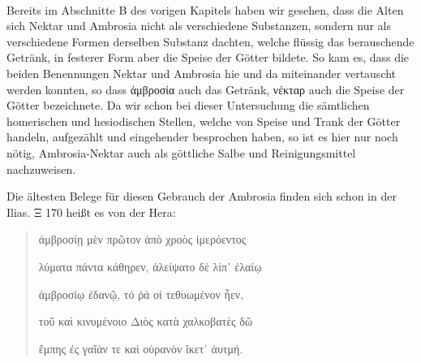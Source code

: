 \documentclass[a4paper, 11pt, oneside]{article}
\begin{document}
\paragraph{}
Bereits im Abschnitte B des vorigen Kapitels haben wir gesehen, dass die Alten sich Nektar und Ambrosia nicht als verschiedene Substanzen, sondern nur als verschiedene Formen derselben Substanz dachten, welche flüssig das berauschende Getränk, in festerer Form aber die Speise der Götter bildete. So kam es, dass die beiden Benennungen Nektar und Ambrosia hie und da miteinander vertauscht werden konnten, so dass ἀμβροσία auch das Getränk, νέκταρ auch die Speise der Götter bezeichnete. Da wir schon bei dieser Untersuchung die sämtlichen homerischen und hesiodischen Stellen, welche von Speise und Trank der Götter handeln, aufgezählt und eingehender besprochen haben, so ist es hier nur noch nötig, Ambrosia-Nektar auch als göttliche Salbe und Reinigungsmittel nachzuweisen.

Die ältesten Belege für diesen Gebrauch der Ambrosia finden sich schon in der Ilias. Ξ 170 heißt es von der Hera:
\begin{quotation}
ἀμβροσίῃ μὲν πρῶτον ἀπὸ χροὸς ἱμερόεντος

λύματα πάντα κάθηρεν, ἀλείψατο δὲ λίπ᾽ ἐλαίῳ

ἀμβροσίῳ ἐδανῷ, τό ῥά οἱ τεθυωμένον ἦεν,

τοῦ καὶ κινυμένοιο Διὸς κατὰ χαλκοβατὲς δῶ

ἔμπης ἐς γαῖάν τε καὶ οὐρανὸν ἵκετ᾽ ἀυτμή.
\end{quotation}
\end{document}
